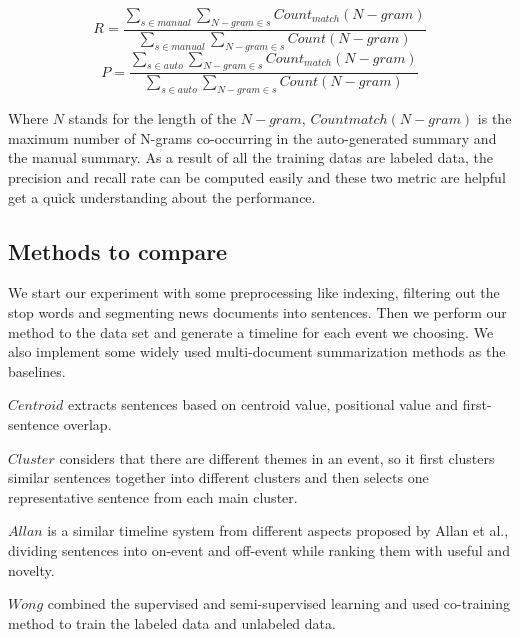 \documentclass{llncs}
\begin{document}
\begin{equation}
R=\frac{\sum_{s \in manual } \sum_{N-gram \in s} Count_{match}(N-gram) } { \sum_{s \in manual} \sum_{N-gram \in s} Count(N-gram)  } \end{equation}
\begin{equation}
P=\frac{\sum_{s \in auto } \sum_{N-gram \in s} Count_{match}(N-gram) } { \sum_{s \in auto} \sum_{N-gram \in s} Count(N-gram)  }
\end{equation}


Where $N$ stands for the length of the $N-gram$, $Countmatch(N-gram)$ is the maximum number of N-grams co-occurring in the auto-generated summary and the manual summary. As a result of all the training datas are labeled data, the precision and recall rate can be computed easily and these two metric are helpful get a quick understanding about the performance.


\subsection{Methods to compare}

We start our experiment with some preprocessing like indexing, filtering out the stop words and segmenting news documents into sentences. Then we perform our method to the data set and generate a timeline for each event we choosing. We also implement some widely used multi-document summarization methods as the baselines.

$Centroid$ extracts sentences based on centroid value, positional value and first-sentence overlap.

$Cluster$ considers that there are different themes in an event, so it first clusters similar sentences together into different clusters and then selects one representative sentence from each main cluster.

$Allan$ is a similar timeline system from different aspects proposed by Allan et al., dividing sentences into on-event and off-event while ranking them with useful and novelty.

$Wong$ combined the supervised and semi-supervised learning and used co-training method to train the labeled data and unlabeled data. 
\end{document}
